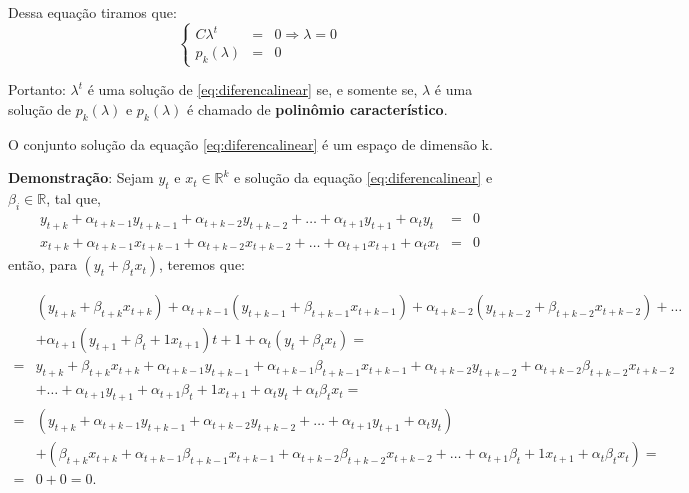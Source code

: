 Dessa equação tiramos que:
$$\left\{
\begin{array}{rcl}
C\lambda^{t} &=& 0 \Rightarrow  \lambda = 0 \\
p_k(\lambda)&=&0
\end{array}\right.$$

Portanto: $\lambda^{t}$ é uma solução de \eqref{eq:diferencalinear} se, e somente se, $\lambda$ é uma solução de $p_{k}(\lambda)$ e $p_{k}(\lambda)$ é chamado de \textbf{polinômio característico}.

\begin{theorem}
O conjunto solução da equação \eqref{eq:diferencalinear} é um espaço de dimensão k.
\end{theorem}

\textbf{Demonstração}: Sejam $y_{t}$ e $x_{t} \in \mathbb{R}^k$ e solução da equação \eqref{eq:diferencalinear} e $\beta_{i} \in \mathbb{R}$, tal que, 
$$\begin{array}{rcl}
y_{t+k} + \alpha_{t+k-1}y_{t+k-1} + \alpha_{t+k-2}y_{t+k-2} + \ldots + \alpha_{t+1}y_{t+1} + \alpha_{t}y_{t} &=& 0 \\
x_{t+k} + \alpha_{t+k-1}x_{t+k-1} + \alpha_{t+k-2}x_{t+k-2} + \ldots + \alpha_{t+1}x_{t+1} + \alpha_{t}x_{t} &=& 0
\end{array}$$
então, para $(y_{t} + \beta_{t}x_{t})$, teremos que:

$$\begin{array}{ll}
 & (y_{t+k} + \beta_{t+k}x_{t+k}) +\alpha_{t+k-1}(y_{t+k-1} + \beta_{t+k-1}x_{t+k-1}) +\alpha_{t+k-2}(y_{t+k-2} + \beta_{t+k-2}x_{t+k-2}) +\ldots \\
 & + \alpha_{t+1}(y_{t+1} + \beta_{t}+1x_{t+1})t +1+ \alpha_{t}(y_{t} + \beta_{t}x_{t}) = \\
=& y_{t+k}+\beta_{t+k}x_{t+k}+\alpha_{t+k-1}y_{t+k-1}+\alpha_{t+k-1}\beta_{t+k-1}x_{t+k-1}+\alpha_{t+k-2}y_{t+k-2}+\alpha_{t+k-2}\beta_{t+k-2}x_{t+k-2} \\
 & + \ldots + \alpha_{t+1}y_{t+1} + \alpha_{t+1}\beta_{t}+1x_{t+1} + \alpha_{t}y_{t} + \alpha_{t}\beta_{t}x_{t} = \\
=& (y_{t+k} + \alpha_{t+k-1}y_{t+k-1} + \alpha_{t+k-2}y_{t+k-2} + \ldots + \alpha_{t+1}y_{t+1} + \alpha_{t}y_{t}) \\
 & + (\beta_{t+k}x_{t+k} + \alpha_{t+k-1}\beta_{t+k-1}x_{t+k-1} + \alpha_{t+k-2}\beta_{t+k-2}x_{t+k-2} + \ldots + \alpha_{t+1}\beta_{t}+1x_{t+1} + \alpha_{t}\beta_{t}x_{t}) = \\
=& 0+0=0.
\end{array}$$

